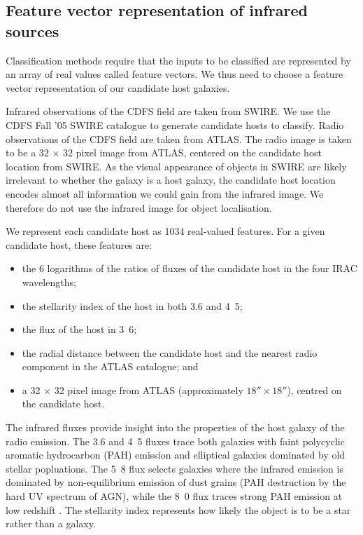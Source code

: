 \documentclass[fleqn,usenatbib,usedcolumn]{mnras}
\begin{document}
  \subsection{Feature vector representation of infrared sources}
  \label{vector-representation-of-infrared-sources}

    Classification methods require that the inputs to be classified are
    represented by an array of real values called feature vectors. We thus
    need to choose a feature vector representation of our candidate host
    galaxies.

    Infrared observations of the CDFS field are taken from SWIRE. We use the
    CDFS Fall '05 SWIRE catalogue \citep{surace05swire} to generate candidate
    hosts to classify. Radio observations of the CDFS field are taken from
    ATLAS. The radio image is taken to be a 32 $\times$ 32 pixel image from
    ATLAS, centered on the candidate host location from SWIRE.
    As the visual appearance of objects in SWIRE are likely irrelevant to
    whether the galaxy is a host galaxy, the candidate host location encodes
    almost all information we could gain from the infrared image. We therefore
    do not use the infrared image for object localisation.

    We represent each candidate host as 1034 real-valued features. For a given
    candidate host, these features are:
    \begin{itemize}
      \item the 6 logarithms of the ratios of fluxes of the candidate
        host in the four IRAC wavelengths;
      \item the stellarity index of the host in both 3.6 and
        \unit{4.5}{\micro\meter};
      \item the flux of the host in \unit{3.6}{\micro\meter};
      \item the radial distance between the candidate host and the nearest
        radio component in the ATLAS catalogue; and
      \item a 32 $\times$ 32 pixel image from ATLAS (approximately $18''
        \times 18''$), centred on the candidate host.
    \end{itemize}

    The infrared fluxes provide insight into the properties of the host galaxy
    of the radio emission. The 3.6 and \unit{4.5}{\micro\meter} fluxes trace
    both galaxies with faint polycyclic aromatic hydrocarbon (PAH) emission and
    elliptical galaxies dominated by old stellar popluations. The
    \unit{5.8}{\micro\meter} flux selects galaxies where the infrared emission
    is dominated by non-equilibrium emission of dust grains (PAH destruction
    by the hard UV spectrum of AGN), while the \unit{8.0}{\micro\meter} flux
    traces strong PAH emission at low redshift \citep{Sajina2005}.
    The stellarity index represents how likely the object is to be a star
    rather than a galaxy.
\end{document}
